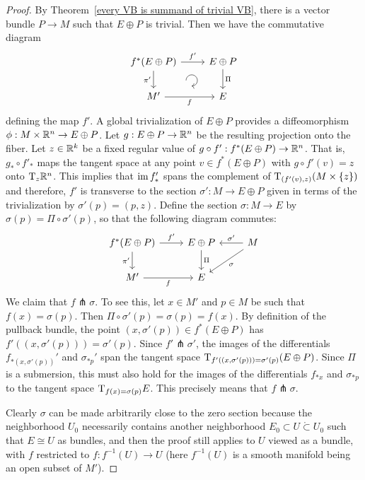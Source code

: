 \begin{proof}
By Theorem~\ref{every VB is summand of trivial VB}, there is a vector bundle $P{\to} M$ such that $E\oplus P$ is trivial. Then we have the commutative diagram
    \[\begin{tikzcd}[every matrix/.append style={name=m}, execute at end picture={\draw [<-] ([xshift=-11mm,yshift=1mm]m-2-2.north) arc[start angle=-90,delta angle=270,radius=0.2cm];}]
    f^\ast(E\oplus P) \arrow[r,"f'"]\arrow[d,swap,"\pi'"]& E\oplus P\arrow[d,"\Pi"] \\
    M'\arrow[r,swap,"f"]& E
    \end{tikzcd}\]
defining the map $f'$. A global trivialization of $E\oplus P$ provides a diffeomorphism $\phi:M\times\mathbb{R}^n\to E\oplus P$. Let $g:E\oplus P\to\mathbb{R}^n$ be the resulting projection onto the fiber. Let $z\in\mathbb{R}^k$ be a fixed regular value of $g\circ f':f^\ast(E\oplus P)\to\mathbb{R}^n$. That is, $g_\ast \circ f'_\ast$ maps the tangent space at any point $v\in f^\ast(E\oplus P)$ with $g\circ f'(v)=z$ onto $\mathrm{T}_z\mathbb{R}^n$. This implies that $\operatorname{im} f_\ast '$ spans the complement of $\mathrm{T}_{(f'(v),z)}(M\times\{z\})$ and therefore, $f'$ is transverse to the section $\sigma':M\to E\oplus P$ given in terms of the trivialization by $\sigma'(p)=(p,z)$. Define the section $\sigma:M\to E$ by $\sigma(p)=\Pi\circ \sigma'(p)$, so that the following diagram commutes:
  \[\begin{tikzcd}
    f^\ast(E\oplus P) \arrow[r,"f'"]\arrow[d,swap,"\pi'"]& E\oplus P\arrow[d,"\Pi"]& M\arrow[l,swap,"\sigma'"] \arrow[dl,"\sigma"]\\
    M'\arrow[r,swap,"f"]& E &
    \end{tikzcd}\]
We claim that $f\pitchfork \sigma$. To see this, let $x\in M'$ and $p\in M$ be such that $f(x)=\sigma(p)$. Then $\Pi\circ\sigma'(p)=\sigma(p)=f(x)$. By definition of the pullback bundle, the point $(x,\sigma'(p))\in f^\ast(E\oplus P)$ has $f'((x,\sigma'(p)))=\sigma'(p)$. Since $f'\pitchfork \sigma'$, the images of the differentials $f_{\ast(x,\sigma'(p))} '$ and $\sigma_{\ast p}'$ span the tangent space $\mathrm{T}_{f'((x,\sigma'(p)))=\sigma'(p)}(E\oplus P)$. Since $\Pi$ is a submersion, this must also hold for the images of the differentials $f_{\ast x}$ and $\sigma_{\ast p}$ to the tangent space $\mathrm{T}_{f(x)=\sigma(p)}E$. This precisely means that $f\pitchfork\sigma$.

Clearly $\sigma$ can be made arbitrarily close to the zero section because the neighborhood $U_0$ necessarily contains another neighborhood $E_0\subset U\mathring{\subset} U_0$ such that $E\cong U$ as bundles, and then the proof still applies to $U$ viewed as a bundle, with $f$ restricted to $f:f^{-1}(U)\to U$ (here $f^{-1}(U)$ is a smooth manifold being an open subset of $M'$).
\end{proof}

